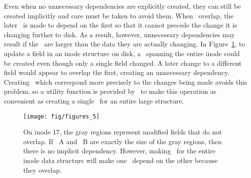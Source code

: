 Even when no unnecessary dependencies are explicitly created, they can still be
created implicitly and care must be taken to avoid them. When \chdescs\ overlap,
the later \chdesc\ is made to depend on the first so that it cannot precede the
change it is changing further to disk. As a result, however, unnecessary
dependencies may result if the \chdescs\ are larger than the data they are
actually changing. In Figure~\ref{fig:overlap}, to update a field in an inode
structure on disk, a \chdesc\ spanning the entire inode could be created even
though only a single field changed. A later change to a different field would
appear to overlap the first, creating an unnecessary dependency. Creating
\chdescs\ which correspond more precisely to the changes being made avoids this
problem, so a utility function is provided by \Kudos\ to make this operation as
convenient as creating a single \chdesc\ for an entire large structure.

\begin{figure}[htb]
  \centering
  \texttt{[image: fig/figures\_5]}
  \caption{\label{fig:overlap} On inode 17, the gray regions represent
  modified fields that do not overlap. If \chdesc\ A and \chdesc\ B are
  exactly the size of the gray regions, then there is no implicit dependency.
  However, making \chdescs\ for the entire inode data structure will make
  one \chdesc\ depend on the other because they overlap.}
\end{figure}
